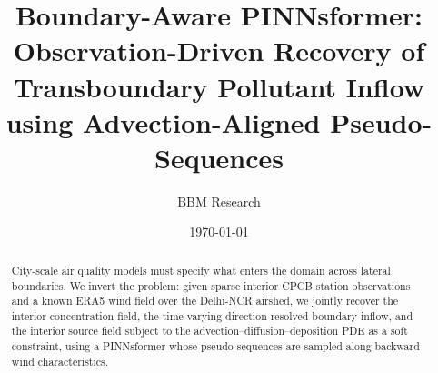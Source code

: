 \documentclass[11pt,a4paper]{article}
\title{Boundary-Aware PINNsformer: Observation-Driven Recovery of Transboundary Pollutant Inflow using Advection-Aligned Pseudo-Sequences}
\author{BBM Research}
\date{\today}
\begin{document}
\maketitle

\begin{abstract}
City-scale air quality models must specify what enters the domain across lateral boundaries.
We invert the problem: given sparse interior CPCB station observations and a known ERA5 wind field over the Delhi-NCR airshed, we jointly recover the interior concentration field, the time-varying direction-resolved boundary inflow, and the interior source field subject to the advection--diffusion--deposition PDE as a soft constraint, using a PINNsformer whose pseudo-sequences are sampled along backward wind characteristics.
\end{abstract}













\end{document}
